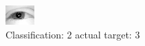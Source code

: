\begin{figure}[h!]
\begin{center}
\includegraphics[width=0.60\columnwidth]{figures/ID2384_class_2_target_3.png}
\end{center}
\caption{ Classification: 2 actual target: 3}
\label{fig:ID2384_class_2_target_3}
\end{figure}
